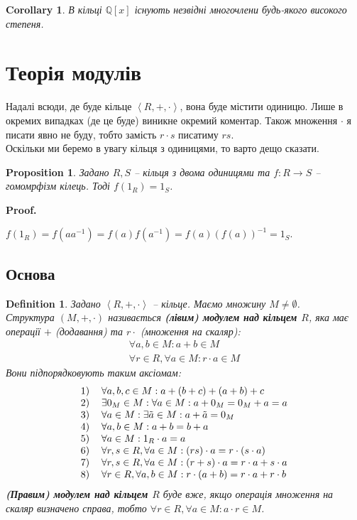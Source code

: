 \documentclass[a4paper, 10pt]{article}
\makeatletter
\theoremstyle{theoremdd}
\theoremstyle{theoremdd}
\newtheorem{definition}[theorem]{Definition}
\theoremstyle{theoremdd}
\theoremstyle{theoremdd}
\theoremstyle{theoremdd}
\theoremstyle{theoremdd}
\theoremstyle{theoremdd}
\theoremstyle{theoremdd}
\theoremstyle{theoremdd}
\newtheorem{proposition}[theorem]{Proposition}
\theoremstyle{theoremdd}
\theoremstyle{theoremdd}
\theoremstyle{theoremdd}
\theoremstyle{theoremdd}
\theoremstyle{theoremdd}
\newtheorem{corollary}[theorem]{Corollary}
\theoremstyle{theoremdd}
\renewenvironment{proof}[1][Proof.\\]{\par
\pushQED{\hfill \qed}%
\normalfont \topsep6\p@\@plus6\p@\relax
\trivlist
\item\relax
{\bfseries
#1\@addpunct{.}}\hspace\labelsep\ignorespaces
}{%
\popQED\endtrivlist\@endpefalse
}
\makeatother
\begin{document}
\begin{corollary}
В кільці $\mathbb{Q}[x]$ існують незвідні многочлени будь-якого високого степеня.
\end{corollary}

\newpage
\section{Теорія модулів}
Надалі всюди, де буде кільце $\left< R,+,\cdot\right>$, вона буде містити одиницю. Лише в окремих випадках (де це буде) виникне окремий коментар. Також множення $\cdot$ я писати явно не буду, тобто замість $r \cdot s$ писатиму $rs$.
\bigskip \\
Оскільки ми беремо в увагу кільця з одиницями, то варто дещо сказати.
\begin{proposition}
Задано $R,S$ -- кільця з двома одиницями та $f \colon R \to S$ -- гомомрфізм кілець. Тоді $f(1_R) = 1_S$.
\end{proposition}

\begin{proof}
$f(1_R) = f(aa^{-1}) = f(a)f(a^{-1}) = f(a)(f(a))^{-1} = 1_S$.
\end{proof}

\subsection{Основа}
\begin{definition}
Задано $\left< R,+,\cdot \right>$ -- кільце. Маємо множину $M \neq \emptyset$.\\
Структура $(M,+,\cdot)$ називається \textbf{(лівим) модулем над кільцем $R$}, яка має операції $+$ (додавання) та $r \cdot$ (множення на скаляр):
\begin{align*}
\forall a,b \in M: a+b \in M \\
\forall r \in R, \forall a \in M: r \cdot a \in M
\end{align*}
Вони підпорядковують таким аксіомам:
\begin{align*}
	\begin{tabular}{cl}
	1) & $\forall a,b,c \in M: a + (b + c) + (a + b) + c$\\
	2) & $\exists 0_M \in M: \forall a \in M: a + 0_M = 0_M + a = a$\\
	3) & $\forall a \in M: \exists \tilde{a} \in M: a + \tilde{a} = 0_M$\\
	4) & $\forall a,b \in M: a + b = b + a$\\
	5) & $\forall a \in M: 1_R \cdot a = a$\\
	6) & $\forall r,s \in R, \forall a \in M: (rs) \cdot a = r \cdot (s \cdot a)$\\
	7) & $\forall r,s \in R, \forall a \in M: (r+s) \cdot a = r \cdot a + s \cdot a$ \\
	8) & $\forall r \in R, \forall a,b \in M: r \cdot (a+b) = r \cdot a + r \cdot b$
	\end{tabular}
	\end{align*}
\textbf{(Правим) модулем над кільцем $R$} буде вже, якщо операція множення на скаляр визначено справа, тобто $\forall r \in R, \forall a \in M: a \cdot r \in M$.
\end{definition}
\end{document}
